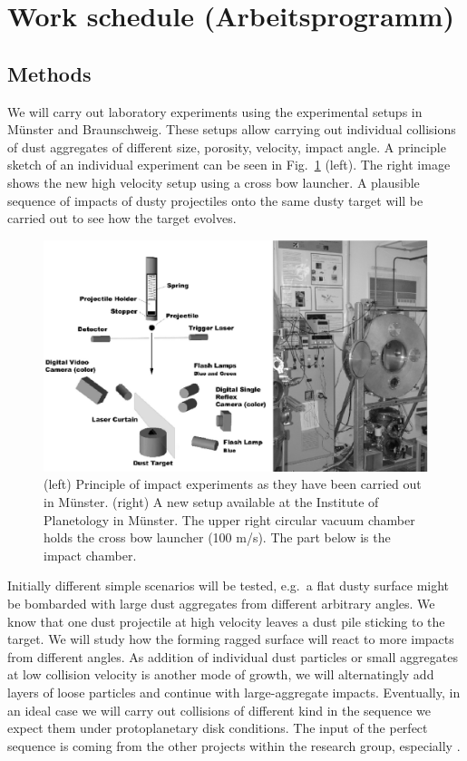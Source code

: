 \section{Work schedule (Arbeitsprogramm)}
\subsection{Methods}
We will carry out laboratory experiments using the experimental setups in
M\"unster and Braunschweig. These setups allow carrying out individual
collisions of dust aggregates of different size, porosity, velocity, impact
angle. A principle sketch of an individual experiment can be seen in
Fig.\ \ref{aufbau} (left). The right image shows the new high velocity setup
using a cross bow launcher.  A plausible sequence of impacts of dusty
projectiles onto the same dusty target will be carried out to see how the
target evolves.

\begin{figure}
\centerline{\includegraphics[width=15cm]{b2fig3.eps}}
\caption{\label{aufbau}(left) Principle of impact experiments as they have
been carried out in M\"unster.  (right) A new setup available at the
Institute of Planetology in M\"unster.  The upper right circular vacuum
chamber holds the cross bow launcher (100 m/s). The part below is the impact
chamber.}
\end{figure}


Initially different simple scenarios will be tested, e.g.\ a flat dusty
surface might be bombarded with large dust aggregates from different
arbitrary angles. We know that one dust projectile at high velocity leaves a
dust pile sticking to the target. We will study how the forming ragged
surface will react to more impacts from different angles. As addition of
individual dust particles or small aggregates at low collision velocity is
another mode of growth, we will alternatingly add layers of loose particles
and continue with large-aggregate impacts. Eventually, in an ideal case we
will carry out collisions of different kind in the sequence we expect them
under protoplanetary disk conditions. The input of the perfect sequence is
coming from the other projects within the research group, especially
\projdul{}.



